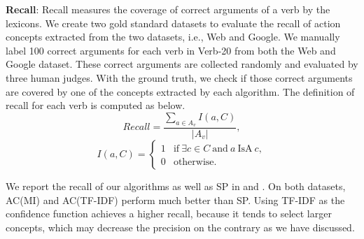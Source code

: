 \textbf{Recall}: Recall measures the coverage of
correct arguments of a verb by the lexicons.
We create two gold standard datasets to evaluate
the recall of action concepts extracted from the
two datasets, i.e., Web and Google.
We manually label 100 correct arguments for each
verb in Verb-20 from both the Web and Google dataset.
These correct arguments are collected randomly and evaluated
by three human judges. With the ground truth, we check
if those correct arguments are covered by one of the concepts
extracted by each algorithm.
The definition of recall for each verb
is computed as below.
$$
Recall=\frac{\sum_{a \in A_v}{I(a,C)}}{|A_v|},
$$
$$
I(a,C)=
\begin{cases}
1 & \mbox{if}~ \exists c \in C\ \mbox{and}\ a\ \mbox{IsA}\ c,\\
0 & \mbox{otherwise.}
\end{cases}
$$

We report the recall of our algorithms %
as well as SP in  and .
On both datasets, AC(MI) and AC(TF-IDF) perform much better than SP.
Using TF-IDF as the confidence function achieves a higher recall, because it
tends to select larger concepts, which may decrease the precision
on the contrary as we have discussed.

